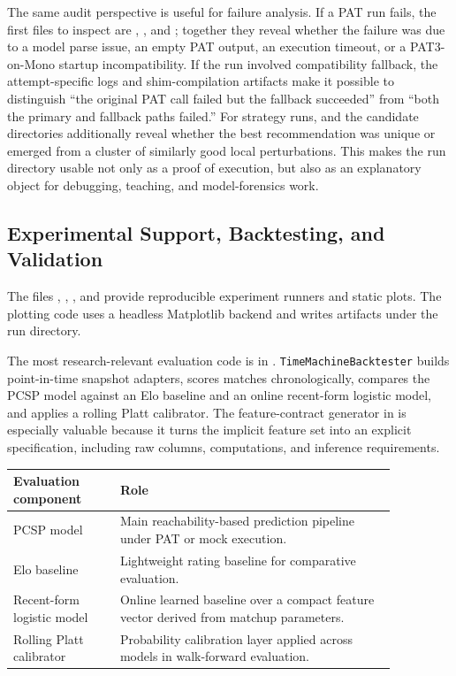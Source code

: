 \documentclass{article}
\begin{document}
The same audit perspective is useful for failure analysis. If a PAT run fails, the first files to inspect are , , and ; together they reveal whether the failure was due to a model parse issue, an empty PAT output, an execution timeout, or a PAT3-on-Mono startup incompatibility. If the run involved compatibility fallback, the attempt-specific logs and shim-compilation artifacts make it possible to distinguish ``the original PAT call failed but the fallback succeeded'' from ``both the primary and fallback paths failed.'' For strategy runs,  and the candidate directories additionally reveal whether the best recommendation was unique or emerged from a cluster of similarly good local perturbations. This makes the run directory usable not only as a proof of execution, but also as an explanatory object for debugging, teaching, and model-forensics work.

\subsection*{Experimental Support, Backtesting, and Validation}
The files , , , and  provide reproducible experiment runners and static plots. The plotting code uses a headless Matplotlib backend and writes artifacts under the run directory.

The most research-relevant evaluation code is in . \texttt{TimeMachineBacktester} builds point-in-time snapshot adapters, scores matches chronologically, compares the PCSP model against an Elo baseline and an online recent-form logistic model, and applies a rolling Platt calibrator. The feature-contract generator in  is especially valuable because it turns the implicit feature set into an explicit specification, including raw columns, computations, and inference requirements.

\begin{table}[H]
\centering
\small
\begin{tabular}{L{0.24\linewidth}L{0.62\linewidth}}
\toprule
Evaluation component & Role \\
\midrule
PCSP model & Main reachability-based prediction pipeline under PAT or mock execution. \\
Elo baseline & Lightweight rating baseline for comparative evaluation. \\
Recent-form logistic model & Online learned baseline over a compact feature vector derived from matchup parameters. \\
Rolling Platt calibrator & Probability calibration layer applied across models in walk-forward evaluation. \\
\bottomrule
\end{tabular}
\end{table}
\end{document}
